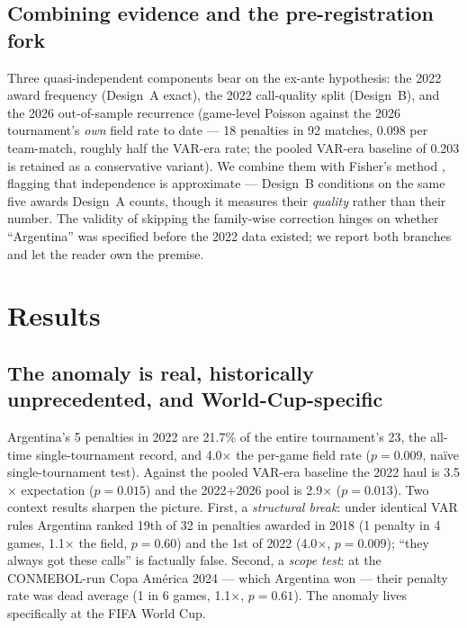 \documentclass[11pt,a4paper]{article}
\newcommand{\pv}[1]{\ensuremath{p = #1}}
\begin{document}
\subsection{Combining evidence and the pre-registration fork}
\label{sec:fork-method}

Three quasi-independent components bear on the ex-ante hypothesis: the 2022 award
frequency (Design~A exact), the 2022 call-quality split (Design~B), and the 2026
out-of-sample recurrence (game-level Poisson against the 2026 tournament's \emph{own}
field rate to date --- 18 penalties in 92 matches, 0.098 per team-match, roughly half
the VAR-era rate; the pooled VAR-era baseline of 0.203 is retained as a conservative
variant). We combine them with Fisher's method \cite{fisher1925}, flagging that
independence is approximate --- Design~B conditions on the same five awards Design~A
counts, though it measures their \emph{quality} rather than their number. The
validity of skipping the family-wise correction hinges on whether ``Argentina'' was
specified before the 2022 data existed; we report both branches and let the reader
own the premise.

\section{Results}
\label{sec:results}

\subsection{The anomaly is real, historically unprecedented, and World-Cup-specific}

Argentina's 5 penalties in 2022 are 21.7\% of the entire tournament's 23, the
all-time single-tournament record, and 4.0$\times$ the per-game field rate
(\pv{0.009}, na\"ive single-tournament test). Against the pooled VAR-era baseline the
2022 haul is 3.5$\times$ expectation (\pv{0.015}) and the 2022+2026 pool is
2.9$\times$ (\pv{0.013}). Two context results sharpen the picture. First, a
\emph{structural break}: under identical VAR rules Argentina ranked 19th of 32 in
penalties awarded in 2018 (1 penalty in 4 games, 1.1$\times$ the field, \pv{0.60}) and
the 1st of 2022 (4.0$\times$, \pv{0.009}); ``they always got these calls'' is
factually false. Second, a \emph{scope test}: at the CONMEBOL-run Copa Am\'erica 2024
--- which Argentina won --- their penalty rate was dead average (1 in 6 games,
1.1$\times$, \pv{0.61}). The anomaly lives specifically at the FIFA World Cup.
\end{document}
